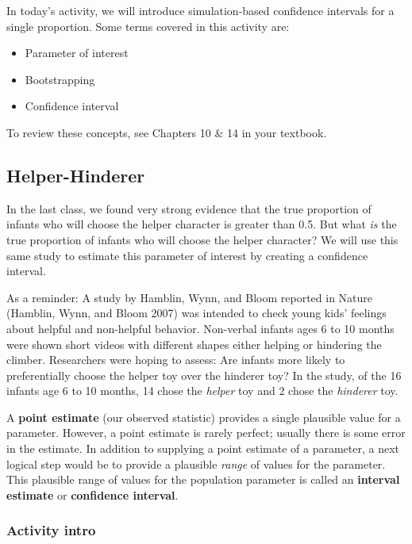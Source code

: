 \documentclass[
]{report}
\begin{document}
In today's activity, we will introduce simulation-based confidence intervals for a single proportion. Some terms covered in this activity are:

\begin{itemize}
\item
  Parameter of interest
\item
  Bootstrapping
\item
  Confidence interval
\end{itemize}

To review these concepts, see Chapters 10 \& 14 in your textbook.

\subsection{Helper-Hinderer}\label{helper-hinderer-2}

In the last class, we found very strong evidence that the true proportion of infants who will choose the helper character is greater than 0.5. But what \emph{is} the true proportion of infants who will choose the helper character? We will use this same study to estimate this parameter of interest by creating a confidence interval.

As a reminder: A study by Hamblin, Wynn, and Bloom reported in Nature (Hamblin, Wynn, and Bloom 2007) was intended to check young kids' feelings about helpful and non-helpful behavior. Non-verbal infants ages 6 to 10 months were shown short videos with different shapes either helping or hindering the climber. Researchers were hoping to assess: Are infants more likely to preferentially choose the helper toy over the hinderer toy? In the study, of the 16 infants age 6 to 10 months, 14 chose the \emph{helper} toy and 2 chose the \emph{hinderer} toy.

A \textbf{point estimate} (our observed statistic) provides a single plausible value for a parameter. However, a point estimate is rarely perfect; usually there is some error in the estimate. In addition to supplying a point estimate of a parameter, a next logical step would be to provide a plausible \emph{range} of values for the parameter. This plausible range of values for the population parameter is called an \textbf{interval estimate} or \textbf{confidence interval}.

\subsubsection*{Activity intro}\label{activity-intro}
\end{document}
